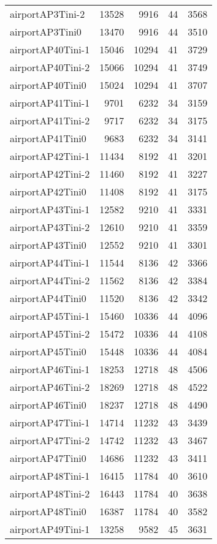 \begin{longtable}{lrrrr}
airportAP3Tini-2 & 13528 & 9916 & 44 & 3568 \\
airportAP3Tini0 & 13470 & 9916 & 44 & 3510 \\
airportAP40Tini-1 & 15046 & 10294 & 41 & 3729 \\
airportAP40Tini-2 & 15066 & 10294 & 41 & 3749 \\
airportAP40Tini0 & 15024 & 10294 & 41 & 3707 \\
airportAP41Tini-1 & 9701 & 6232 & 34 & 3159 \\
airportAP41Tini-2 & 9717 & 6232 & 34 & 3175 \\
airportAP41Tini0 & 9683 & 6232 & 34 & 3141 \\
airportAP42Tini-1 & 11434 & 8192 & 41 & 3201 \\
airportAP42Tini-2 & 11460 & 8192 & 41 & 3227 \\
airportAP42Tini0 & 11408 & 8192 & 41 & 3175 \\
airportAP43Tini-1 & 12582 & 9210 & 41 & 3331 \\
airportAP43Tini-2 & 12610 & 9210 & 41 & 3359 \\
airportAP43Tini0 & 12552 & 9210 & 41 & 3301 \\
airportAP44Tini-1 & 11544 & 8136 & 42 & 3366 \\
airportAP44Tini-2 & 11562 & 8136 & 42 & 3384 \\
airportAP44Tini0 & 11520 & 8136 & 42 & 3342 \\
airportAP45Tini-1 & 15460 & 10336 & 44 & 4096 \\
airportAP45Tini-2 & 15472 & 10336 & 44 & 4108 \\
airportAP45Tini0 & 15448 & 10336 & 44 & 4084 \\
airportAP46Tini-1 & 18253 & 12718 & 48 & 4506 \\
airportAP46Tini-2 & 18269 & 12718 & 48 & 4522 \\
airportAP46Tini0 & 18237 & 12718 & 48 & 4490 \\
airportAP47Tini-1 & 14714 & 11232 & 43 & 3439 \\
airportAP47Tini-2 & 14742 & 11232 & 43 & 3467 \\
airportAP47Tini0 & 14686 & 11232 & 43 & 3411 \\
airportAP48Tini-1 & 16415 & 11784 & 40 & 3610 \\
airportAP48Tini-2 & 16443 & 11784 & 40 & 3638 \\
airportAP48Tini0 & 16387 & 11784 & 40 & 3582 \\
airportAP49Tini-1 & 13258 & 9582 & 45 & 3631 \\

\end{longtable}
